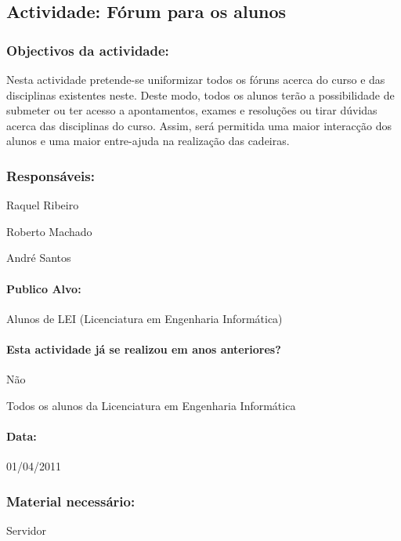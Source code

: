 \subsection{Actividade: Fórum para os alunos} %

\subsubsection*{Objectivos da actividade:}
Nesta actividade pretende-se uniformizar todos os fóruns acerca do curso e das disciplinas existentes neste. Deste modo, todos os alunos terão a possibilidade de submeter ou ter acesso a apontamentos, exames e resoluções ou tirar dúvidas acerca das disciplinas do curso. Assim, será permitida uma maior interacção dos alunos e uma maior entre-ajuda na realização das cadeiras. 

\subsubsection*{Responsáveis:}
\begin{itemizedash}
	\item{Raquel Ribeiro}
	\item{Roberto Machado}
	\item{André Santos}
\end{itemizedash}

\paragraph{Publico Alvo: }
Alunos de LEI (Licenciatura em Engenharia Informática)

\paragraph{Esta actividade já se realizou em anos anteriores?}
Não

Todos os alunos da Licenciatura em Engenharia Informática

\paragraph{Data:} 01/04/2011

\subsubsection*{Material necessário:}
\begin{itemizedash}
	\item{Servidor}
\end{itemizedash}

